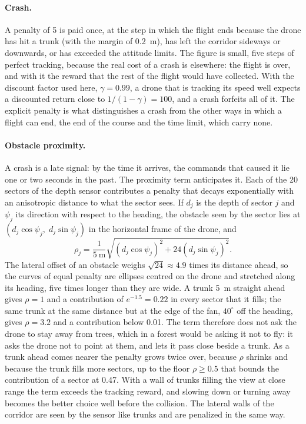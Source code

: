 \paragraph{Crash.} A penalty of 5 is paid once, at the step in which the flight ends because the drone has hit a trunk (with the margin of 0.2~m), has left the corridor sideways or downwards, or has exceeded the attitude limits. The figure is small, five steps of perfect tracking, because the real cost of a crash is elsewhere: the flight is over, and with it the reward that the rest of the flight would have collected. With the discount factor used here, $\gamma = 0.99$, a drone that is tracking its speed well expects a discounted return close to $1/(1-\gamma) = 100$, and a crash forfeits all of it. The explicit penalty is what distinguishes a crash from the other ways in which a flight can end, the end of the course and the time limit, which carry none.

\paragraph{Obstacle proximity.} A crash is a late signal: by the time it arrives, the commands that caused it lie one or two seconds in the past. The proximity term anticipates it. Each of the 20 sectors of the depth sensor contributes a penalty that decays exponentially with an anisotropic distance to what the sector sees. If $d_j$ is the depth of sector $j$ and $\psi_j$ its direction with respect to the heading, the obstacle seen by the sector lies at $(d_j \cos\psi_j,\; d_j \sin\psi_j)$ in the horizontal frame of the drone, and
\begin{equation}
\rho_j = \frac{1}{5~\mathrm{m}} \sqrt{\left(d_j \cos\psi_j\right)^2 + 24 \left(d_j \sin\psi_j\right)^2}.
\label{eq:reward-obstacle}
\end{equation}
The lateral offset of an obstacle weighs $\sqrt{24} \approx 4.9$ times its distance ahead, so the curves of equal penalty are ellipses centred on the drone and stretched along its heading, five times longer than they are wide. A trunk 5~m straight ahead gives $\rho = 1$ and a contribution of $e^{-1.5} = 0.22$ in every sector that it fills; the same trunk at the same distance but at the edge of the fan, $40^{\circ}$ off the heading, gives $\rho = 3.2$ and a contribution below 0.01. The term therefore does not ask the drone to stay away from trees, which in a forest would be asking it not to fly: it asks the drone not to point at them, and lets it pass close beside a trunk. As a trunk ahead comes nearer the penalty grows twice over, because $\rho$ shrinks and because the trunk fills more sectors, up to the floor $\rho \ge 0.5$ that bounds the contribution of a sector at 0.47. With a wall of trunks filling the view at close range the term exceeds the tracking reward, and slowing down or turning away becomes the better choice well before the collision. The lateral walls of the corridor are seen by the sensor like trunks and are penalized in the same way.

